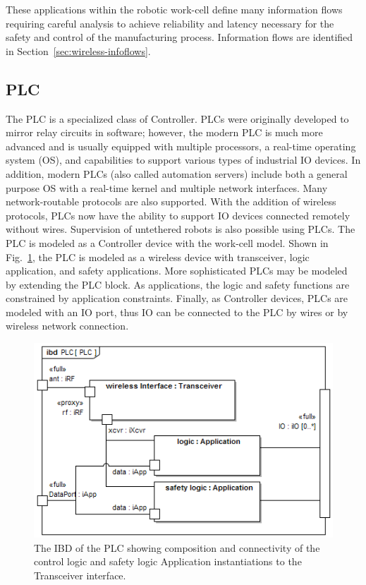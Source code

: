 \documentclass[journal, twoside]{IEEEtran}
\begin{document}
	These applications within the robotic work-cell define many information flows requiring careful analysis to achieve reliability and latency necessary for the safety and control of the manufacturing process. Information flows are identified in Section~\ref{sec:wireless-infoflows}.
	
	\subsection{PLC}\label{sec:plc}
	The PLC is a specialized class of Controller.  PLCs were originally developed to mirror relay circuits in software; however, the modern PLC is much more advanced and is usually equipped with multiple processors, a real-time operating system (OS), and capabilities to support various types of industrial IO devices.  In addition, modern PLCs (also called automation servers) include both a general purpose OS with a real-time kernel and multiple network interfaces.  Many network-routable protocols are also supported.  With the addition of wireless protocols, PLCs now have the ability to support IO devices connected remotely without wires.  Supervision of untethered robots is also possible using PLCs.  The PLC is modeled as a Controller device with the work-cell model.  Shown in Fig.~\ref{fig:PLC:ibd}, the PLC is modeled as a wireless device with transceiver, logic application, and safety applications.  More sophisticated PLCs may be modeled by extending the PLC block.  As applications, the logic and safety functions are constrained by application constraints. Finally, as Controller devices, PLCs are modeled with an IO port, thus IO can be connected to the PLC by wires or by wireless network connection.
	
	\begin{figure}
		\centering
		\includegraphics[width=\columnwidth]{diagrams/ibd__PLC__PLC}
		\caption{The IBD of the PLC showing composition and connectivity of the control logic and safety logic Application instantiations to the Transceiver interface. }
		\label{fig:PLC:ibd}
	\end{figure}
	
\end{document}
